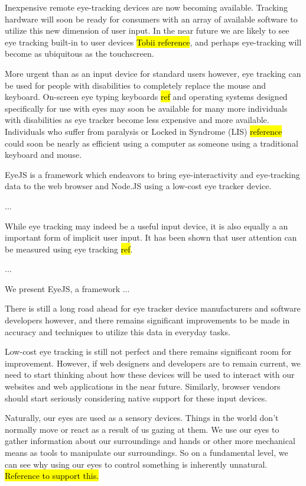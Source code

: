 \documentclass{sigchi}
\begin{document}
Inexpensive remote eye-tracking devices are now becoming available. Tracking hardware will soon be ready for consumers with an array of available software to utilize this new dimension of user input. In the near future we are likely to see eye tracking built-in to user devices \hl{Tobii reference}, and perhaps eye-tracking will become as ubiquitous as the touchscreen. 

More urgent than as an input device for standard users however, eye tracking can be used for people with disabilities to completely replace the mouse and keyboard. On-screen eye typing keyboards \hl{ref} and operating systems designed specifically for use with eyes may soon be available for many more individuals with disabilities as eye tracker become less expensive and more available. Individuals who suffer from paralysis or Locked in Syndrome (LIS) \hl{reference} could soon be nearly as efficient using a computer as someone using a traditional keyboard and mouse.

EyeJS is a framework which endeavors to bring eye-interactivity and
eye-tracking data to the web browser and Node.JS using a low-cost eye
tracker device. 

...

While eye tracking may indeed be a useful input device, it is also equally a an important form of implicit user input. It has been shown that user attention can be measured using eye tracking \hl{ref}.

...

We present EyeJS, a framework ...



There is still a long road ahead for eye tracker device manufacturers and software developers however, and there remains significant improvements to be made in accuracy and techniques to utilize this data in everyday tasks.



Low-cost eye tracking is still not perfect and there remains significant room for improvement. However, if web designers and developers are to remain current, we need to start thinking about how these devices will be used to interact with our websites and web applications in the near future. Similarly, browser vendors should start seriously considering native support for these input devices.

Naturally, our eyes are used as a sensory devices. Things in the world don't normally move or react as a result of us gazing at them. We use our eyes to gather information about our surroundings and hands or other more mechanical means as tools to manipulate our surroundings. So on a fundamental level, we can see why using our eyes to control something is inherently unnatural. \hl{Reference to support this.}
\end{document}
